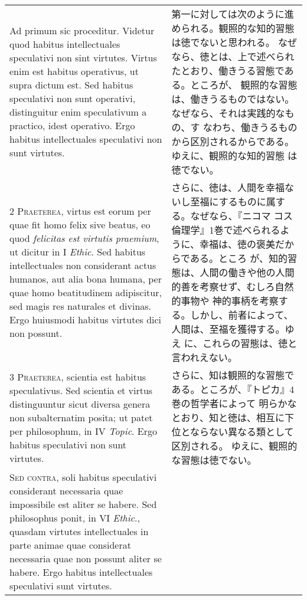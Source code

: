 \documentclass[10pt]{jsarticle} %
\begin{document}
\begin{longtable}{p{21em}p{21em}}

{\huge A}{\sc d primum sic proceditur}. 
Videtur quod habitus intellectuales speculativi non sint
 virtutes. Virtus enim est habitus operativus, ut supra dictum est. Sed
 habitus speculativi non sunt operativi, distinguitur enim speculativum
 a practico, idest operativo. Ergo habitus intellectuales speculativi
 non sunt virtutes.

&

第一に対しては次のように進められる。観照的な知的習態は徳でないと思われる。
 なぜなら、徳とは、上で述べられたとおり、働きうる習態である。ところが、
 観照的な習態は、働きうるものではない。なぜなら、それは実践的なもの、す
 なわち、働きうるものから区別されるからである。ゆえに、観照的な知的習態
 は徳でない。

\\

{\scshape 2 Praeterea}, virtus est eorum per quae fit homo felix sive
 beatus, eo quod {\itshape felicitas est virtutis praemium}, ut dicitur
 in I {\itshape Ethic}. Sed habitus intellectuales non considerant actus
 humanos, aut alia bona humana, per quae homo beatitudinem adipiscitur,
 sed magis res naturales et divinas. Ergo huiusmodi habitus virtutes
 dici non possunt.


&
さらに、徳は、人間を幸福ないし至福にするものに属する。なぜなら、『ニコマ
 コス倫理学』1巻で述べられるように、幸福は、徳の褒美だからである。ところ
 が、知的習態は、人間の働きや他の人間的善を考察せず、むしろ自然的事物や
 神的事柄を考察する。しかし、前者によって、人間は、至福を獲得する。ゆえ
 に、これらの習態は、徳と言われえない。


\\




{\scshape 3 Praeterea}, scientia est habitus speculativus. Sed scientia
 et virtus distinguuntur sicut diversa genera non subalternatim posita;
 ut patet per philosophum, in IV {\itshape Topic}. Ergo habitus
 speculativi non sunt virtutes.

&

さらに、知は観照的な習態である。ところが、『トピカ』4巻の哲学者によって
 明らかなとおり、知と徳は、相互に下位とならない異なる類として区別される。
 ゆえに、観照的な習態は徳でない。

\\




{\scshape Sed contra}, soli habitus speculativi considerant necessaria
 quae impossibile est aliter se habere. Sed philosophus ponit, in VI
 {\itshape Ethic}., quasdam virtutes intellectuales in parte animae quae
 considerat necessaria quae non possunt aliter se habere. Ergo habitus
 intellectuales speculativi sunt virtutes.


\end{longtable}
\end{document}
